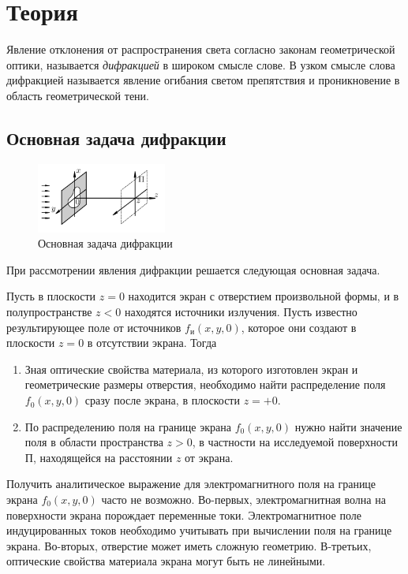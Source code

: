 \section*{Теория}

Явление отклонения от распространения света согласно законам геометрической оптики, называется \textit{дифракцией} в широком смысле слове. В узком смысле слова дифракцией называется явление огибания светом препятствия и проникновение в область геометрической тени.

\subsection*{Основная задача дифракции}

\begin{figure}
	\centering
	\includegraphics[width=0.38\textwidth]{../Изображения/Задача дифракции.png}
	\caption{Основная задача дифракции}
\end{figure}

При рассмотрении явления дифракции решается следующая основная задача.

Пусть в плоскости $z = 0$ находится экран с отверстием произвольной формы, и в полупространстве $z < 0$ находятся источники излучения. Пусть известно результирующее поле от источников $f_и(x, y, 0)$, которое они создают в плоскости $z = 0$ в отсутствии экрана. Тогда
\begin{enumerate}
	\item Зная оптические свойства материала, из которого изготовлен экран и геометрические размеры отверстия, необходимо найти распределение поля $f_0(x, y, 0)$ сразу после экрана, в плоскости $z = +0$.
		
	\item По распределению поля на границе экрана $f_0(x, y, 0)$ нужно найти значение поля в области пространства $z > 0$, в частности на исследуемой поверхности $П$, находящейся на расстоянии $z$ от экрана.
\end{enumerate}

Получить аналитическое выражение для электромагнитного поля на границе экрана $f_0(x, y, 0)$ часто не возможно. Во-первых, электромагнитная волна на поверхности экрана порождает переменные токи. Электромагнитное поле индуцированных токов необходимо учитывать при вычислении поля на границе экрана. Во-вторых, отверстие может иметь сложную геометрию. В-третьих, оптические свойства материала экрана могут быть не линейными.

